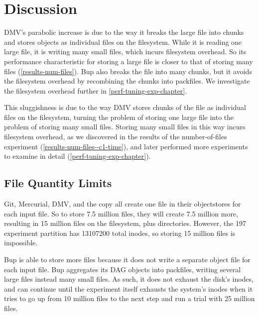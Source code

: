 \section{Discussion}





DMV's parabolic increase is due to the way it breaks the large file into chunks and stores objects as individual files on the filesystem.
While it is reading one large file, it is writing many small files, which incurs filesystem overhead.
So its performance characteristic for storing a large file is closer to that of storing many files (\autoref{results-num-files}).
Bup also breaks the file into many chunks, but it avoids the filesystem overhead by recombining the chunks into \glspl{packfile}.
We investigate the filesystem overhead further in \autoref{perf-tuning-exp-chapter}.

This sluggishness is due to the way DMV stores chunks of the file as individual files on the filesystem, turning the problem of storing one large file into the problem of storing many small files.
Storing many small files in this way incurs filesystem overhead, as we discovered in the results of the number-of-files experiment (\autoref{results-num-files--c1-time}), and later performed more experiments to examine in detail (\autoref{perf-tuning-exp-chapter}).

\subsection{File Quantity Limits}

Git, Mercurial, DMV, and the copy all create one file in their \glspl{objectstore} for each input file.
So to store \num{7.5} million files, they will create \num{7.5} million more, resulting in \num{15} million files on the filesystem, plus directories.
However, the \SI{197}{\gib} experiment partition has \num{13107200} total \glspl{inode}, so storing \num{15} million files is impossible.

Bup is able to store more files because it does not write a separate object file for each input file.
Bup aggregates its DAG objects into \glspl{packfile}, writing several large files instead many small files.
As such, it does not exhaust the disk's \glspl{inode}, and can continue until the experiment itself exhausts the system's \glspl{inode} when it tries to go up from \num{10} million files to the next step and run a trial with \num{25} million files.

